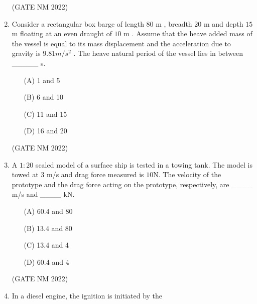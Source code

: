 \documentclass[journal,12pt,onecolumn]{IEEEtran}
\theoremstyle{remark}
\begin{document}
\begin{enumerate}
\hfill (GATE NM 2022)





\item  Consider a rectangular box barge of length $80$ m , breadth $20$ m  and depth $15$ m  floating at an even draught of $10$ m . Assume that the heave added mass of the vessel is equal to its mass displacement and the acceleration due to gravity is $9.81  m/s^2 $ . The heave natural period of the vessel lies in between \_\_\_\_\_  s.

	\begin{multicols}{4}

\begin{enumerate}
    \item[(A)] 1 and 5
    \item[(B)] 6 and 10
    \item[(C)] 11 and 15
    \item[(D)] 16 and 20
\end{enumerate}

	\end{multicols}

\hfill(GATE NM 2022)





\item  A $1{:}20$ scaled model of a surface ship is tested in a towing tank. The model is towed at 3 m/s  and drag force measured is $10$N. The velocity of the prototype and the drag force acting on the prototype, respectively, are \_\_\_\_   m/s and \_\_\_\_   kN.

	\begin{multicols}{4}

\begin{enumerate}
    \item[(A)] 60.4 and 80
    \item[(B)] 13.4 and 80
    \item[(C)] 13.4 and 4
    \item[(D)] 60.4 and 4
\end{enumerate}

	\end{multicols}

\hfill(GATE NM 2022)





\item  In a diesel engine, the ignition is initiated by the

	\begin{multicols}{2}


\end{multicols}
\end{enumerate}
\end{document}
